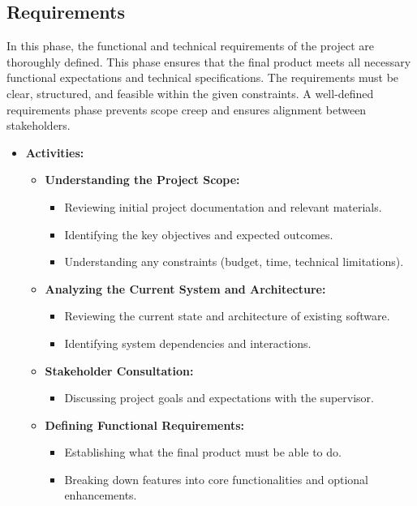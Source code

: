 \documentclass{article}
\begin{document}
\subsection{Requirements}
In this phase, the functional and technical requirements of the project are thoroughly defined. This phase ensures that the final product meets all necessary functional expectations and technical specifications. The requirements must be clear, structured, and feasible within the given constraints. A well-defined requirements phase prevents scope creep and ensures alignment between stakeholders.

\begin{itemize}[leftmargin=*, label={}]
    \item \textbf{Activities:}
    \begin{itemize}
        \item \textbf{Understanding the Project Scope:}
        \begin{itemize}
            \item Reviewing initial project documentation and relevant materials.
            \item Identifying the key objectives and expected outcomes.
            \item Understanding any constraints (budget, time, technical limitations).
        \end{itemize}
        \item \textbf{Analyzing the Current System and Architecture:}
        \begin{itemize}
            \item Reviewing the current state and architecture of existing software.
            \item Identifying system dependencies and interactions.
        \end{itemize}
        \item \textbf{Stakeholder Consultation:}
        \begin{itemize}
            \item Discussing project goals and expectations with the supervisor.
        \end{itemize}
        \item \textbf{Defining Functional Requirements:}
        \begin{itemize}
            \item Establishing what the final product must be able to do.
            \item Breaking down features into core functionalities and optional enhancements.

\end{itemize}
\end{itemize}
\end{itemize}
\end{document}
